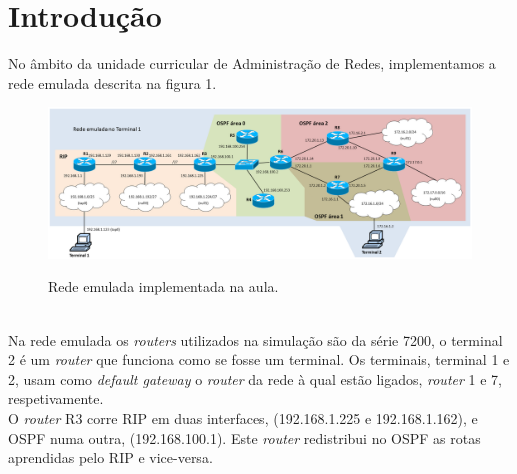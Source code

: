 \section*{Introdução}

No âmbito da unidade curricular de Administração de Redes, implementamos a rede emulada descrita na figura 1.\\
\begin{figure}[h]
\centering
\includegraphics[width=1\textwidth, height=0.33\textheight]{rede-emulada.png}
\label{fig:rede emulada}
\caption{Rede emulada implementada na aula.}
\end{figure}
\\
Na rede emulada os \emph{routers} utilizados na simulação são da série 7200, o terminal 2 é um \emph{router} que funciona como se fosse um terminal.
Os terminais, terminal 1 e 2, usam como \emph{default gateway} o \emph{router} da rede à qual estão ligados, \emph{router} 1 e 7, respetivamente.\\
O \emph{router} R3 corre RIP em duas interfaces, (192.168.1.225 e 192.168.1.162), e OSPF numa outra, (192.168.100.1). Este \emph{router} redistribui no OSPF as rotas aprendidas pelo RIP e vice-versa.
